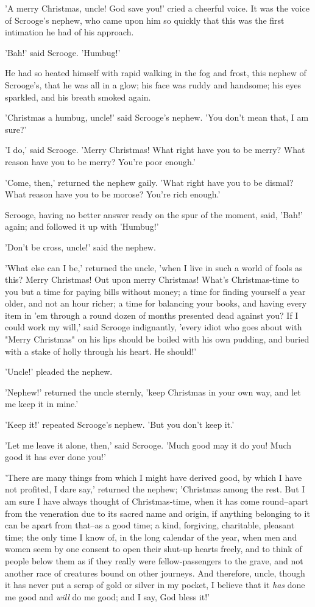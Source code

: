 'A merry Christmas, uncle! God save you!' cried a cheerful voice. It was
the voice of Scrooge's nephew, who came upon him so quickly that this
was the first intimation he had of his approach.

'Bah!' said Scrooge. 'Humbug!'

He had so heated himself with rapid walking in the fog and frost, this
nephew of Scrooge's, that he was all in a glow; his face was ruddy and
handsome; his eyes sparkled, and his breath smoked again.

'Christmas a humbug, uncle!' said Scrooge's nephew. 'You don't mean
that, I am sure?'

'I do,' said Scrooge. 'Merry Christmas! What right have you to be merry?
What reason have you to be merry? You're poor enough.'

'Come, then,' returned the nephew gaily. 'What right have you to be
dismal? What reason have you to be morose? You're rich enough.'

Scrooge, having no better answer ready on the spur of the moment, said,
'Bah!' again; and followed it up with 'Humbug!'

'Don't be cross, uncle!' said the nephew.

'What else can I be,' returned the uncle, 'when I live in such a world
of fools as this? Merry Christmas! Out upon merry Christmas! What's
Christmas-time to you but a time for paying bills without money; a time
for finding yourself a year older, and not an hour richer; a time for
balancing your books, and having every item in 'em through a round dozen
of months presented dead against you? If I could work my will,' said
Scrooge indignantly, 'every idiot who goes about with "Merry Christmas"
on his lips should be boiled with his own pudding, and buried with a
stake of holly through his heart. He should!'

'Uncle!' pleaded the nephew.

'Nephew!' returned the uncle sternly, 'keep Christmas in your own way,
and let me keep it in mine.'

'Keep it!' repeated Scrooge's nephew. 'But you don't keep it.'

'Let me leave it alone, then,' said Scrooge. 'Much good may it do you!
Much good it has ever done you!'

'There are many things from which I might have derived good, by which I
have not profited, I dare say,' returned the nephew; 'Christmas among
the rest. But I am sure I have always thought of Christmas-time, when
it has come round--apart from the veneration due to its sacred name and
origin, if anything belonging to it can be apart from that--as a good
time; a kind, forgiving, charitable, pleasant time; the only time I know
of, in the long calendar of the year, when men and women seem by one
consent to open their shut-up hearts freely, and to think of people
below them as if they really were fellow-passengers to the grave, and
not another race of creatures bound on other journeys. And therefore,
uncle, though it has never put a scrap of gold or silver in my pocket, I
believe that it \emph{has} done me good and \emph{will} do me good; and I say, God
bless it!'

